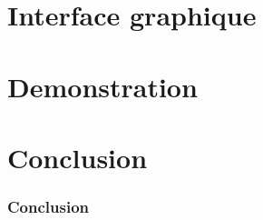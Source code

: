\documentclass{beamer}
\begin{document}
\author{PATTYN Maxime}
\section{Interface graphique}
\begin{frame}
  
\end{frame}

\section{Demonstration}
\begin{frame}
  
\end{frame}


\section{Conclusion}
\begin{frame}
  \frametitle{Conclusion}
\end{frame}
\end{document}
